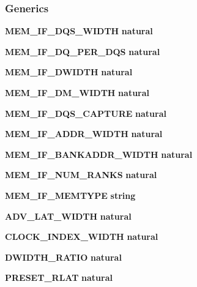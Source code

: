 \subsubsection*{Generics}
 \begin{DoxyCompactItemize}
\item 
{\bf M\+E\+M\+\_\+\+I\+F\+\_\+\+D\+Q\+S\+\_\+\+W\+I\+D\+TH} {\bfseries {\bfseries \textcolor{comment}{natural}\textcolor{vhdlchar}{ }}}
\item 
{\bf M\+E\+M\+\_\+\+I\+F\+\_\+\+D\+Q\+\_\+\+P\+E\+R\+\_\+\+D\+QS} {\bfseries {\bfseries \textcolor{comment}{natural}\textcolor{vhdlchar}{ }}}
\item 
{\bf M\+E\+M\+\_\+\+I\+F\+\_\+\+D\+W\+I\+D\+TH} {\bfseries {\bfseries \textcolor{comment}{natural}\textcolor{vhdlchar}{ }}}
\item 
{\bf M\+E\+M\+\_\+\+I\+F\+\_\+\+D\+M\+\_\+\+W\+I\+D\+TH} {\bfseries {\bfseries \textcolor{comment}{natural}\textcolor{vhdlchar}{ }}}
\item 
{\bf M\+E\+M\+\_\+\+I\+F\+\_\+\+D\+Q\+S\+\_\+\+C\+A\+P\+T\+U\+RE} {\bfseries {\bfseries \textcolor{comment}{natural}\textcolor{vhdlchar}{ }}}
\item 
{\bf M\+E\+M\+\_\+\+I\+F\+\_\+\+A\+D\+D\+R\+\_\+\+W\+I\+D\+TH} {\bfseries {\bfseries \textcolor{comment}{natural}\textcolor{vhdlchar}{ }}}
\item 
{\bf M\+E\+M\+\_\+\+I\+F\+\_\+\+B\+A\+N\+K\+A\+D\+D\+R\+\_\+\+W\+I\+D\+TH} {\bfseries {\bfseries \textcolor{comment}{natural}\textcolor{vhdlchar}{ }}}
\item 
{\bf M\+E\+M\+\_\+\+I\+F\+\_\+\+N\+U\+M\+\_\+\+R\+A\+N\+KS} {\bfseries {\bfseries \textcolor{comment}{natural}\textcolor{vhdlchar}{ }}}
\item 
{\bf M\+E\+M\+\_\+\+I\+F\+\_\+\+M\+E\+M\+T\+Y\+PE} {\bfseries {\bfseries \textcolor{comment}{string}\textcolor{vhdlchar}{ }}}
\item 
{\bf A\+D\+V\+\_\+\+L\+A\+T\+\_\+\+W\+I\+D\+TH} {\bfseries {\bfseries \textcolor{comment}{natural}\textcolor{vhdlchar}{ }}}
\item 
{\bf C\+L\+O\+C\+K\+\_\+\+I\+N\+D\+E\+X\+\_\+\+W\+I\+D\+TH} {\bfseries {\bfseries \textcolor{comment}{natural}\textcolor{vhdlchar}{ }}}
\item 
{\bf D\+W\+I\+D\+T\+H\+\_\+\+R\+A\+T\+IO} {\bfseries {\bfseries \textcolor{comment}{natural}\textcolor{vhdlchar}{ }}}
\item 
{\bf P\+R\+E\+S\+E\+T\+\_\+\+R\+L\+AT} {\bfseries {\bfseries \textcolor{comment}{natural}\textcolor{vhdlchar}{ }}}
\item 

\end{DoxyCompactItemize}
